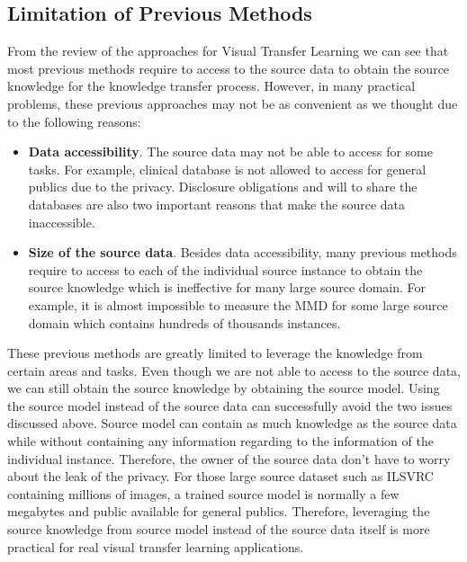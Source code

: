 \subsection{Limitation of Previous Methods}
From the review of the approaches for Visual Transfer Learning we can see that
most previous methods require to access to the source data to obtain the source knowledge for the knowledge transfer process. However, in many practical problems, these previous approaches may not be as convenient as we thought due to the following reasons:

\begin{itemize}
	\item \textbf{Data accessibility}. The source data may not be able to access for some tasks. For example, clinical database is not allowed to access for general publics due to the privacy. Disclosure obligations and will to share the databases are also two important reasons that make the source data inaccessible.
	\item \textbf{Size of the source data}. Besides data accessibility, many previous methods \cite{daume2009frustratingly}\cite{duan2012learning} require to access to each of the individual source instance to obtain the source knowledge which is ineffective for many large source domain. For example, it is almost impossible to measure the MMD for some large source domain which contains hundreds of thousands instances.
\end{itemize}

These previous methods are greatly limited to leverage the knowledge from certain areas and tasks. Even though we are not able to access to the source data, we can still obtain the source knowledge by obtaining the source model. Using the source model instead of the source data can successfully avoid the two issues discussed above. Source model can contain as much knowledge as the source data while without containing any information regarding to the information of the individual instance. Therefore, the owner of the source data don't have to worry about the leak of the privacy. For those large source dataset such as ILSVRC containing millions of images, a trained source model is normally a few megabytes and public available for general publics. Therefore, leveraging the source knowledge from source model instead of the source data itself is more practical for real visual transfer learning applications.
